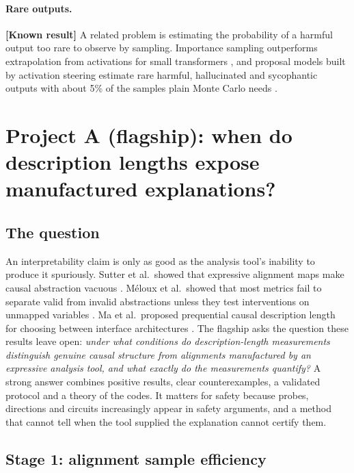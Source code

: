 \documentclass[11pt,a4paper]{article}
\newcommand{\evl}[2]{{\small\bfseries\color{#1}[#2]}}
\newcommand{\LKnown}{\evl{cknown}{Known result}}
\begin{document}
\paragraph{Rare outputs.} \LKnown{} A related problem is estimating the
probability of a harmful output too rare to observe by sampling.
Importance sampling outperforms extrapolation from activations for small
transformers \cite{wuhilton2025}, and proposal models built by activation
steering estimate rare harmful, hallucinated and sycophantic outputs with
about 5\% of the samples plain Monte Carlo needs \cite{angell2026}.

\section{Project A (flagship): when do description lengths expose manufactured explanations?}
\label{sec:projA}

\subsection{The question}

An interpretability claim is only as good as the analysis tool's inability
to produce it spuriously. Sutter et al.\ showed that expressive alignment
maps make causal abstraction vacuous \cite{sutter2025}. Méloux et al.\
showed that most metrics fail to separate valid from invalid abstractions
unless they test interventions on unmapped variables \cite{meloux2026}. Ma
et al.\ proposed prequential causal description length for choosing between
interface architectures \cite{ma2026}. The flagship asks the question these
results leave open: \emph{under what conditions do description-length
measurements distinguish genuine causal structure from alignments
manufactured by an expressive analysis tool, and what exactly do the
measurements quantify?} A strong answer combines positive results, clear
counterexamples, a validated protocol and a theory of the codes. It matters
for safety because probes, directions and circuits increasingly appear in
safety arguments, and a method that cannot tell when the tool supplied the
explanation cannot certify them.

\subsection{Stage 1: alignment sample efficiency}
\label{sec:stage1}
\end{document}
